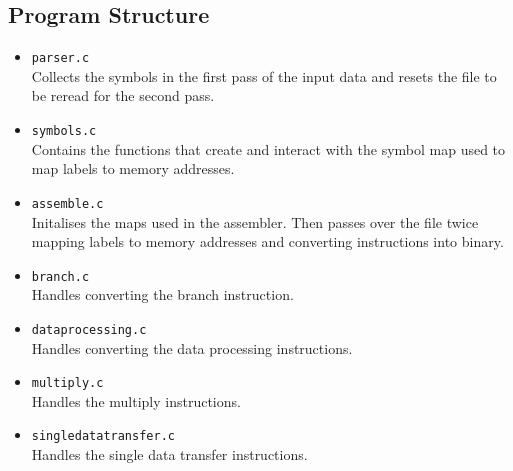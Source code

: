 \documentclass[8pt]{article}
\begin{document}
\begin{minipage}{0.45\textwidth}
\subsection{Program Structure}

\begin{itemize}
    \item \texttt{parser.c} \\Collects the symbols in the first pass of the
    input data and resets the file to be reread for the second pass.
    \item \texttt{symbols.c} \\Contains the functions that create and interact with the
    symbol map used to map labels to memory addresses.
    \item \texttt{assemble.c} \\Initalises the maps used in the assembler. Then 
    passes over the file twice mapping labels to memory addresses and converting
    instructions into binary.
    \item \texttt{branch.c} \\Handles converting the branch instruction.
    \item \texttt{dataprocessing.c} \\Handles converting the data processing
    instructions.
    \item \texttt{multiply.c} \\Handles the multiply instructions.
    \item \texttt{singledatatransfer.c} \\Handles the single data transfer instructions.
\end{itemize}
\end{minipage}%
\hfill
\end{document}
